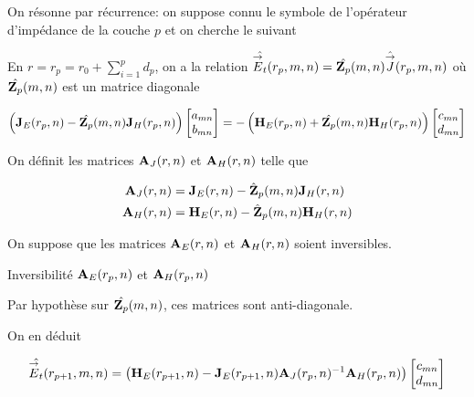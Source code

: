        On résonne par récurrence: on suppose connu le symbole de l'opérateur d'impédance de la couche \(p\) et on cherche le suivant

        En \(r=r_{p}=r_0+\sum_{i=1}^p d_p\), on a la relation \( \hat{{\overset{\rightarrow}{E}}_t}(r_p,m,n) = \hat{\mathbf{Z}_p}(m,n)\hat{{\overset{\rightarrow}{J}}}(r_p,m,n)\) où \(\hat{\mathbf{Z}_p}(m,n)\) est un matrice diagonale

        \begin{equation}
            \left(\mathbf{J}_{E}(r_p,n) - \hat{\mathbf{Z}_p}(m,n)\mathbf{J}_{H}(r_p,n) \right)
            \begin{bmatrix}
                a_{mn}
                \\
                b_{mn}
            \end{bmatrix}
            = -
            \left(\mathbf{H}_{E}(r_p,n) + \hat{\mathbf{Z}_p}(m,n)\mathbf{H}_{H}(r_p,n) \right)
            \begin{bmatrix}
                c_{mn}
                \\
                d_{mn}
            \end{bmatrix}
        \end{equation}

        On définit les matrices \(\mathbf{A}_{J}(r,n)\) et \(\mathbf{A}_{H}(r,n)\) telle que

        \begin{align}
            \mathbf{A}_{J}(r,n) &= \mathbf{J}_{E}(r,n) - \hat{\mathbf{Z}}_p(m,n)\mathbf{J}_{H}(r,n)
            \\
            \mathbf{A}_{H}(r,n) &= \mathbf{H}_{E}(r,n) - \hat{\mathbf{Z}}_p(m,n)\mathbf{H}_{H}(r,n)
        \end{align}

        On suppose que les matrices \(\mathbf{A}_{E}(r,n)\) et \(\mathbf{A}_{H}(r,n)\) soient inversibles.

        \begin{TODO}
          Inversibilité \(\mathbf{A}_{E}(r_p,n)\) et \(\mathbf{A}_{H}(r_p,n)\)
        \end{TODO}

        Par hypothèse sur \(\hat{\mathbf{Z}_p}(m,n)\), ces matrices sont anti-diagonale.

        On en déduit

        \begin{equation}
            \hat{{\overset{\rightarrow}{E}}_t}(r_{p+1},m,n) = 
            \left(
                \mathbf{H}_{E}(r_{p+1},n)
                -
                \mathbf{J}_{E}(r_{p+1},n)
                \mathbf{A}_{J}(r_p,n)^{-1}
                \mathbf{A}_{H}(r_p,n)
            \right)
            \begin{bmatrix}
                c_{mn}
                \\
                d_{mn}
            \end{bmatrix}
        \end{equation}


